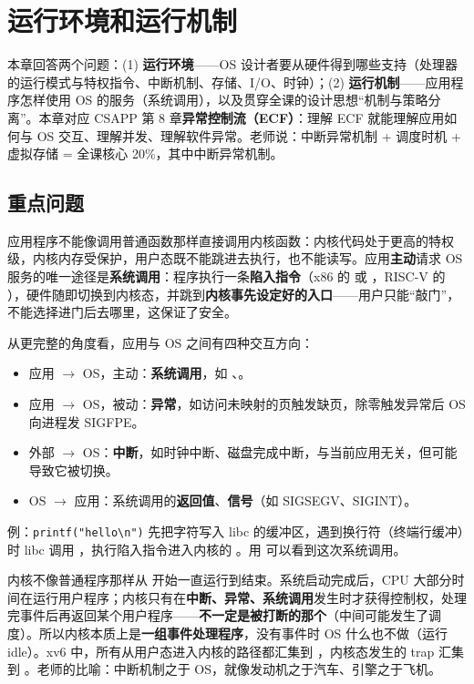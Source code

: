 \section{运行环境和运行机制}

本章回答两个问题：(1) \textbf{运行环境}——OS 设计者要从硬件得到哪些支持（处理器的运行模式与特权指令、中断机制、存储、I/O、时钟）；(2) \textbf{运行机制}——应用程序怎样使用 OS 的服务（系统调用），以及贯穿全课的设计思想“机制与策略分离”。本章对应 CSAPP 第 8 章\textbf{异常控制流（ECF）}：理解 ECF 就能理解应用如何与 OS 交互、理解并发、理解软件异常。老师说：中断异常机制 + 调度时机 + 虚拟存储 = 全课核心 20\%，其中中断异常机制。

\subsection{重点问题}

应用程序不能像调用普通函数那样直接调用内核函数：内核代码处于更高的特权级，内核内存受保护，用户态既不能跳进去执行，也不能读写。应用\textbf{主动}请求 OS 服务的唯一途径是\textbf{系统调用}：程序执行一条\textbf{陷入指令}（x86 的  或 ，RISC-V 的 ），硬件随即切换到内核态，并跳到\textbf{内核事先设定好的入口}——用户只能“敲门”，不能选择进门后去哪里，这保证了安全。

从更完整的角度看，应用与 OS 之间有四种交互方向：
\begin{itemize}
    \item 应用 $\to$ OS，主动：\textbf{系统调用}，如 、。
    \item 应用 $\to$ OS，被动：\textbf{异常}，如访问未映射的页触发缺页，除零触发异常后 OS 向进程发 SIGFPE。
    \item 外部 $\to$ OS：\textbf{中断}，如时钟中断、磁盘完成中断，与当前应用无关，但可能导致它被切换。
    \item OS $\to$ 应用：系统调用的\textbf{返回值}、\textbf{信号}（如 SIGSEGV、SIGINT）。
\end{itemize}
例：\texttt{printf("hello\textbackslash n")} 先把字符写入 libc 的缓冲区，遇到换行符（终端行缓冲）时 libc 调用 ，执行陷入指令进入内核的 。用  可以看到这次系统调用。

内核不像普通程序那样从  开始一直运行到结束。系统启动完成后，CPU 大部分时间在运行用户程序；内核只有在\textbf{中断、异常、系统调用}发生时才获得控制权，处理完事件后再返回某个用户程序——\textbf{不一定是被打断的那个}（中间可能发生了调度）。所以内核本质上是\textbf{一组事件处理程序}，没有事件时 OS 什么也不做（运行 idle）。xv6 中，所有从用户态进入内核的路径都汇集到 ，内核态发生的 trap 汇集到 。老师的比喻：中断机制之于 OS，就像发动机之于汽车、引擎之于飞机。

